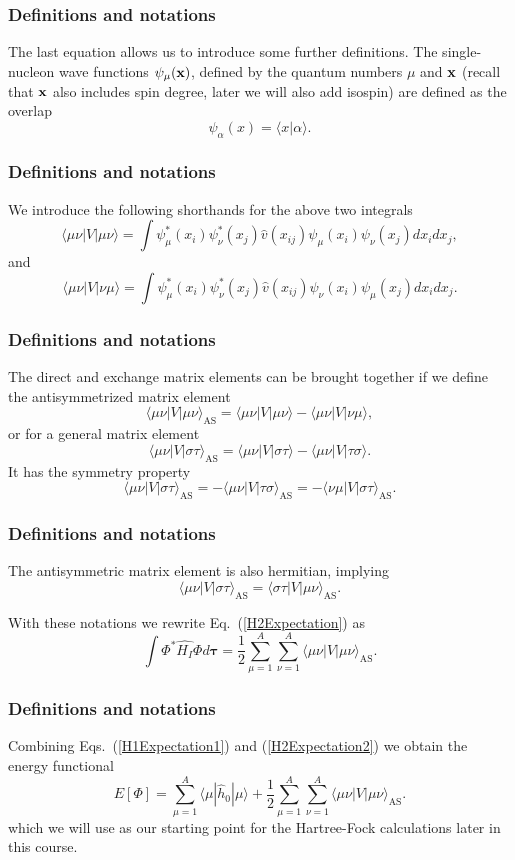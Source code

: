 \documentclass[compress]{beamer}
\begin{document}
\frame
{
  \frametitle{Definitions and notations}
\begin{small}
{\scriptsize
The last equation allows us to  introduce some further definitions.  
The single-nucleon wave functions $\psi_{\mu}({\bf x})$, defined by the quantum numbers $\mu$ and ${\bf x}$
(recall that ${\bf x}$ also includes spin degree, later we will also add isospin)   are defined as the overlap 
\[
   \psi_{\alpha}(x)  = \langle x | \alpha \rangle .
\]

}
\end{small}
}
\frame
{
  \frametitle{Definitions and notations}
\begin{small}
{\scriptsize
We introduce the following shorthands for the above two integrals
\[
\langle \mu\nu|V|\mu\nu\rangle =  \int \psi_{\mu}^*(x_i)\psi_{\nu}^*(x_j)\hat{v}(x_{ij})\psi_{\mu}(x_i)\psi_{\nu}(x_j)
    dx_idx_j,
\]
and 
\[
\langle \mu\nu|V|\nu\mu\rangle = \int \psi_{\mu}^*(x_i)\psi_{\nu}^*(x_j)
  \hat{v}(x_{ij})\psi_{\nu}(x_i)\psi_{\mu}(x_j)
  dx_idx_j.  
\]
}
\end{small}
}
\frame
{
  \frametitle{Definitions and notations}
\begin{small}
{\scriptsize
The direct and exchange matrix elements can be  brought together if we define the antisymmetrized matrix element
\[
\langle \mu\nu|V|\mu\nu\rangle_{\mathrm{AS}}= \langle \mu\nu|V|\mu\nu\rangle-\langle \mu\nu|V|\nu\mu\rangle,
\]
or for a general matrix element  
\[
\langle \mu\nu|V|\sigma\tau\rangle_{\mathrm{AS}}= \langle \mu\nu|V|\sigma\tau\rangle-\langle \mu\nu|V|\tau\sigma\rangle.
\]
It has the symmetry property
\[
\langle \mu\nu|V|\sigma\tau\rangle_{\mathrm{AS}}= -\langle \mu\nu|V|\tau\sigma\rangle_{\mathrm{AS}}=-\langle \nu\mu|V|\sigma\tau\rangle_{\mathrm{AS}}.
\]
}
\end{small}
}
\frame
{
  \frametitle{Definitions and notations}
\begin{small}
{\scriptsize
The antisymmetric matrix element is also hermitian, implying 
\[
\langle \mu\nu|V|\sigma\tau\rangle_{\mathrm{AS}}= \langle \sigma\tau|V|\mu\nu\rangle_{\mathrm{AS}}.
\]

With these notations we rewrite Eq.~(\ref{H2Expectation}) as 
\begin{equation}
  \int \Phi^*\hat{H_I}\Phi d\mathbf{\tau} 
  = \frac{1}{2}\sum_{\mu=1}^A\sum_{\nu=1}^A \langle \mu\nu|V|\mu\nu\rangle_{\mathrm{AS}}.
\label{H2Expectation2}
\end{equation}

}
\end{small}
}
\frame
{
  \frametitle{Definitions and notations}
\begin{small}
{\scriptsize
Combining Eqs.~(\ref{H1Expectation1}) and
(\ref{H2Expectation2}) we obtain the energy functional 
\begin{equation}
  E[\Phi] 
  = \sum_{\mu=1}^A \langle \mu | \hat{h}_0 | \mu \rangle +
  \frac{1}{2}\sum_{{\mu}=1}^A\sum_{{\nu}=1}^A \langle \mu\nu|V|\mu\nu\rangle_{\mathrm{AS}}.
\label{FunctionalEPhi}
\end{equation}
which we will use as our starting point for the Hartree-Fock calculations later in this course. 
}
\end{small}
}
\end{document}
